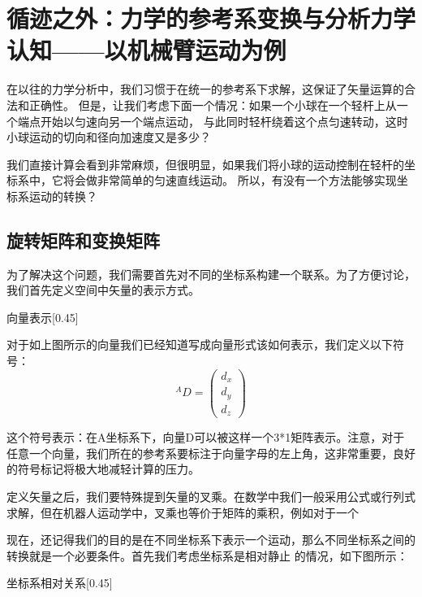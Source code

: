 \chapter*{循迹之外：力学的参考系变换与分析力学认知——以机械臂运动为例}

\let\oldthesection\thesection
\let\oldthesubsection\thesubsection

\setcounter{section}{0}
\renewcommand{\thesection}{\arabic{section}}
\renewcommand{\thesubsection}{\thesection.\arabic{subsection}}

在以往的力学分析中，我们习惯于在统一的参考系下求解，这保证了矢量运算的合法和正确性。
但是，让我们考虑下面一个情况：如果一个小球在一个轻杆上从一个端点开始以匀速向另一个端点运动，
与此同时轻杆绕着这个点匀速转动，这时小球运动的切向和径向加速度又是多少？

我们直接计算会看到非常麻烦，但很明显，如果我们将小球的运动控制在轻杆的坐标系中，它将会做非常简单的匀速直线运动。
所以，有没有一个方法能够实现坐标系运动的转换？
\section{旋转矩阵和变换矩阵}
为了解决这个问题，我们需要首先对不同的坐标系构建一个联系。为了方便讨论，我们首先定义空间中矢量的表示方式。

\begin{singlefigure}[向量示意图]{向量表示}[0.45]
\end{singlefigure}

对于如上图所示的向量我们已经知道写成向量形式该如何表示，我们定义以下符号：
\[^A D = \begin{pmatrix} d_x \\ d_y \\ d_z \end{pmatrix}\]

这个符号表示：在A坐标系下，向量D可以被这样一个3*1矩阵表示。注意，对于任意一个向量，我们所在的参考系要标注于向量字母的左上角，这非常重要，良好的符号标记将极大地减轻计算的压力。

定义矢量之后，我们要特殊提到矢量的叉乘。在数学中我们一般采用公式或行列式求解，但在机器人运动学中，叉乘也等价于矩阵的乘积，例如对于一个

现在，还记得我们的目的是在不同坐标系下表示一个运动，那么不同坐标系之间的转换就是一个必要条件。首先我们考虑坐标系是相对静止
的情况，如下图所示：
\begin{singlefigure}[坐标系相对关系]{坐标系相对关系}[0.45]
\end{singlefigure}


